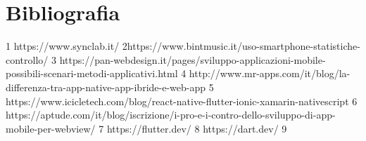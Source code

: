 

\cleardoublepage
\chapter{Bibliografia}

\nocite{*}
\printbibliography[heading=subbibliography,title={Riferimenti bibliografici},type=book]

\printbibliography[heading=subbibliography,title={Siti web consultati},type=online]

1 https://www.synclab.it/
2https://www.bintmusic.it/uso-smartphone-statistiche-controllo/
3 https://pan-webdesign.it/pages/sviluppo-applicazioni-mobile-possibili-scenari-metodi-applicativi.html
4 http://www.mr-apps.com/it/blog/la-differenza-tra-app-native-app-ibride-e-web-app
5
https://www.icicletech.com/blog/react-native-flutter-ionic-xamarin-nativescript
6
https://aptude.com/it/blog/iscrizione/i-pro-e-i-contro-dello-sviluppo-di-app-mobile-per-webview/
7 https://flutter.dev/
8 https://dart.dev/
9










